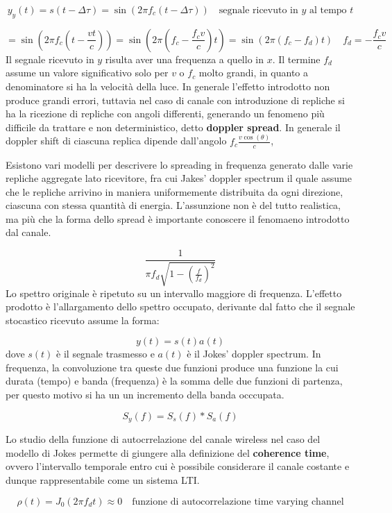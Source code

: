 \[
    y_y(t) = s(t-\Delta \tau) = \sin(2\pi f_c (t-\Delta \tau)) \quad \text{segnale ricevuto in $y$ al tempo $t$}
\]

\[
    = \sin\left(2\pi f_c \left(t - \frac{vt}{c}\right)\right) = \sin\left(2\pi \left(f_c - \frac{f_c v}{c}\right) t\right) = \sin\left(2\pi \left(f_c - f_d \right) t \right) \quad \boxed{f_d = -\frac{f_c v}{c}}
\]
Il segnale ricevuto in $y$ risulta aver una frequenza a quello in $x$. Il termine $f_d$ assume un valore significativo solo per $v$ o $f_c$ molto grandi, in quanto a denominatore si ha la velocità della luce. In generale l'effetto introdotto non produce grandi errori, tuttavia nel caso di canale con introduzione di repliche si ha la ricezione di repliche con angoli differenti, generando un fenomeno più difficile da trattare e non deterministico, detto \textbf{doppler spread}.
In generale il doppler shift di ciascuna replica dipende dall'angolo $f_c \frac{v \cos(\theta)}{c}$, 

Esistono vari modelli per descrivere lo spreading in frequenza generato dalle varie repliche aggregate lato ricevitore, fra cui Jakes' doppler spectrum il quale assume che le repliche arrivino in maniera uniformemente distribuita da ogni direzione, ciascuna con stessa quantità di energia. L'assunzione non è del tutto realistica, ma più che la forma dello spread è importante conoscere il fenomaeno introdotto dal canale.



\[
  \frac{1}{\pi f_d \sqrt{1 - \left(\frac{f}{f_d}\right)^2}}
\]
Lo spettro originale è ripetuto su un intervallo maggiore di frequenza. L'effetto prodotto è l'allargamento dello spettro occupato, derivante dal fatto che il segnale stocastico ricevuto assume la forma:

\[
    y(t) = s(t) a(t)
\]
dove $s(t)$ è il segnale trasmesso e $a(t)$ è il Jokes' doppler spectrum. In frequenza, la convoluzione tra queste due funzioni produce una funzione la cui durata (tempo) e banda (frequenza) è la somma delle due funzioni di partenza, per questo motivo si ha un un incremento della banda occcupata.

\[
    S_y(f) = S_s(f) \ast S_a(f) 
\]

Lo studio della funzione di autocrrelazione del canale wireless nel caso del modello di Jokes permette di giungere alla definizione del \textbf{coherence time}, ovvero l'intervallo temporale entro cui è possibile considerare il canale costante e dunque rappresentabile come un sistema LTI.

\[
    \rho (t) = J_0(2\pi f_d t) \approx 0 \quad \text{funzione di autocorrelazione time varying channel}
\]

